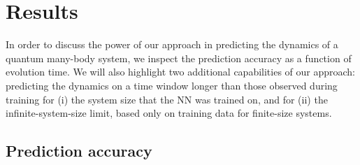 \documentclass[a4paper,aps,amsmath,amssymb,twocolumn,longbibliography,,accepted=2022-05-17]{quantumarticle}
\begin{document}


\section{Results}


In order to discuss the power of our approach in predicting the dynamics of a quantum many-body system, we inspect the prediction accuracy as a function of evolution time. 
We will also highlight two additional capabilities of our approach:  predicting the dynamics on a time window longer than those observed during training for (i)  the  system size that the NN was trained on, and  for (ii) the infinite-system-size limit, based only on training data for finite-size systems.



\subsection{Prediction accuracy}
\end{document}
